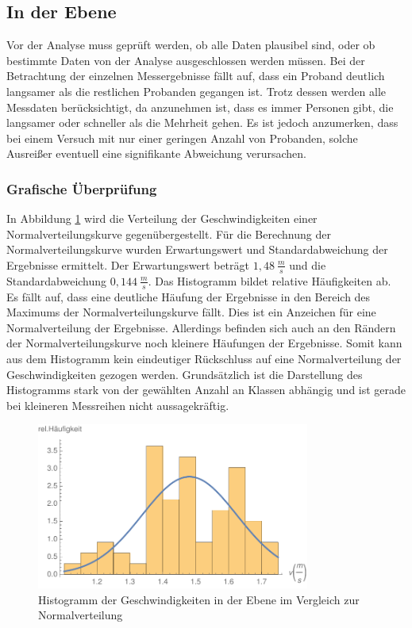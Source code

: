 \subsection{In der Ebene}
Vor der Analyse muss geprüft werden, ob alle Daten plausibel sind, oder ob bestimmte Daten von der Analyse ausgeschlossen werden müssen. Bei der Betrachtung der einzelnen Messergebnisse fällt auf, dass ein Proband deutlich langsamer als die restlichen Probanden gegangen ist. Trotz dessen werden alle Messdaten berücksichtigt, da anzunehmen ist, dass es immer Personen gibt, die langsamer oder schneller als die Mehrheit gehen. Es ist jedoch anzumerken, dass bei einem Versuch mit nur einer geringen Anzahl von Probanden, solche Ausreißer eventuell eine signifikante Abweichung verursachen.

\subsubsection{Grafische Überprüfung}
In Abbildung \ref{fig:histogramm_ebene} wird die Verteilung der Geschwindigkeiten einer Normalverteilungskurve gegenübergestellt. Für die Berechnung der Normalverteilungskurve wurden Erwartungswert und Standardabweichung der Ergebnisse ermittelt. Der Erwartungswert beträgt $1,48\ \frac{m}{s}$ und die Standardabweichung $0,144\ \frac{m}{s}$. Das Histogramm bildet relative Häufigkeiten ab. Es fällt auf, dass eine deutliche Häufung der Ergebnisse in den Bereich des Maximums der Normalverteilungskurve fällt. Dies ist ein Anzeichen für eine Normalverteilung der Ergebnisse. Allerdings befinden sich auch an den Rändern der Normalverteilungskurve noch kleinere Häufungen der Ergebnisse. Somit kann aus dem Histogramm kein eindeutiger Rückschluss auf eine Normalverteilung der Geschwindigkeiten gezogen werden. Grundsätzlich ist die Darstellung des Histogramms stark von der gewählten Anzahl an Klassen abhängig und ist gerade bei kleineren Messreihen nicht aussagekräftig.
\begin{figure}[htpb]
\centering
\includegraphics[width=0.8\textwidth]{abbildungen/Histogramm_2017_Ebene.pdf}
\caption{Histogramm der Geschwindigkeiten in der Ebene im Vergleich zur Normalverteilung}
\label{fig:histogramm_ebene}
\end{figure}

